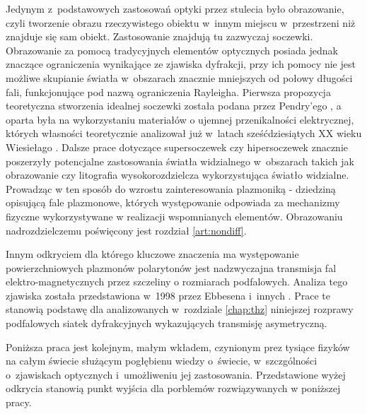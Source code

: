 
Jedynym z~podstawowych zastosowań optyki przez stulecia było obrazowanie, czyli tworzenie obrazu rzeczywistego obiektu w~innym miejscu w~przestrzeni niż znajduje się sam obiekt. Zastosowanie znajdują tu zazwyczaj soczewki. Obrazowanie za pomocą tradycyjnych elementów optycznych posiada jednak znaczące ograniczenia wynikające ze zjawiska dyfrakcji, przy ich pomocy nie jest możliwe skupianie światła w~obszarach znacznie mniejszych od połowy długości fali, funkcjonujące pod nazwą ograniczenia Rayleigha. Pierwsza propozycja teoretyczna stworzenia idealnej soczewki została podana przez Pendry'ego \cite{PhysRevLett.85.3966}, a oparta była na wykorzystaniu materiałów o ujemnej przenikalności elektrycznej, których własności teoretycznie analizował już w~latach sześćdziesiątych XX wieku Wiesiełago \cite{veselago1968electrodynamics}. Dalsze prace dotyczące supersoczewek czy hipersoczewek \cite{liu2007far} znacznie poszerzyły potencjalne zastosowania światła widzialnego w~obszarach takich jak obrazowanie czy litografia wysokorozdzielcza wykorzystująca światło widzialne. Prowadząc w ten sposób do wzrostu zainteresowania plazmoniką - dziedziną opisującą fale plazmonowe, których występowanie odpowiada za mechanizmy fizyczne wykorzystywane w realizacji wspomnianych elementów. Obrazowaniu nadrozdzielczemu poświęcony jest rozdział \ref{art:nondiff}.

Innym odkryciem dla którego kluczowe znaczenia ma występowanie powierzchniowych plazmonów polarytonów jest nadzwyczajna transmisja fal elektro-magnetycznych przez szczeliny o rozmiarach podfalowych. Analiza tego zjawiska została przedstawiona w~1998 przez Ebbesena i~innych \cite{ebbesen1998extraordinary}. Prace te stanowią podstawę dla analizowanych w~rozdziale \ref{chap:thz} niniejszej rozprawy podfalowych siatek dyfrakcyjnych wykazujących transmisję asymetryczną.

Poniższa praca jest kolejnym, małym wkładem, czynionym prez tysiące fizyków na całym świecie służącym pogłębienu wiedzy o~świecie, w~szczgólności o~zjawiskach optycznych i~umożliweniu jej zastosowania. Przedstawione wyżej odkrycia stanowią punkt wyjścia dla porblemów rozwiązywanych w poniższej pracy.
